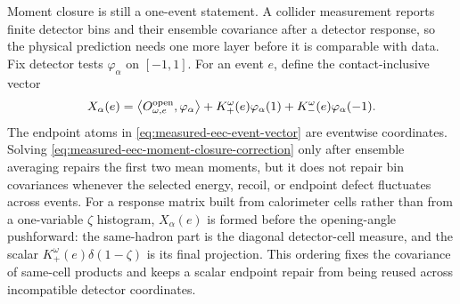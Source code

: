 \begin{controlledapproximation}
\label{ca:measured-eec-response-covariance-contract}
Moment closure is still a one-event statement.  A collider measurement reports
finite detector bins and their ensemble covariance after a detector response,
so the physical prediction needs one more layer before it is comparable with
data.  Fix detector tests \(\varphi_\alpha\) on \([-1,1]\).  For an event
\(e\), define the contact-inclusive vector
\begin{equation}
  X_\alpha(e)
  =
  \left\langle O_{\omega,e}^{\rm open},\varphi_\alpha\right\rangle
  +
  K^\omega_+(e)\varphi_\alpha(1)
  +
  K^\omega_-(e)\varphi_\alpha(-1) .
  \label{eq:measured-eec-event-vector}
\end{equation}
The endpoint atoms in \eqref{eq:measured-eec-event-vector} are eventwise
coordinates.  Solving \eqref{eq:measured-eec-moment-closure-correction} only
after ensemble averaging repairs the first two mean moments, but it does not
repair bin covariances whenever the selected energy, recoil, or endpoint
defect fluctuates across events.
For a response matrix built from calorimeter cells rather than from a
one-variable \(\zeta\) histogram, \(X_\alpha(e)\) is formed before the
opening-angle pushforward: the same-hadron part is the diagonal detector-cell
measure, and the scalar \(K_+^\omega(e)\delta(1-\zeta)\) is its final
projection.  This ordering fixes the covariance of same-cell products and
keeps a scalar endpoint repair from being reused across incompatible detector
coordinates.


\end{controlledapproximation}
